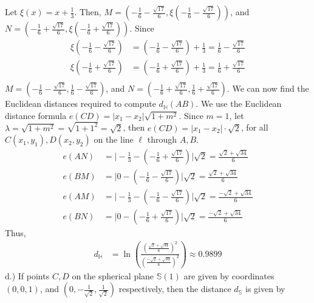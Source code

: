 \documentclass{report}
\begin{document}
    Let $\xi(x) = x+\frac{1}{3}$. Then, $M = \left(-\frac{1}{6} - \frac{\sqrt{17}}{6}, \xi\left(-\frac{1}{6} - \frac{\sqrt{17}}{6}\right)\right)$, and $N = \left(-\frac{1}{6} + \frac{\sqrt{17}}{6}, \xi\left(-\frac{1}{6} + \frac{\sqrt{17}}{6}\right)\right) $. Since
    \begin{align*}
        \xi\left(-\frac{1}{6} - \frac{\sqrt{17}}{6}\right) &= \left(-\frac{1}{6} - \frac{\sqrt{17}}{6}\right) + \frac{1}{3} = \frac{1}{6} - \frac{\sqrt{17}}{6} \\
        \xi\left(-\frac{1}{6} + \frac{\sqrt{17}}{6}\right) &= \left(-\frac{1}{6} + \frac{\sqrt{17}}{6}\right) + \frac{1}{3} = \frac{1}{6} + \frac{\sqrt{17}}{6} \\
    \end{align*}
    $M = \left(-\frac{1}{6} - \frac{\sqrt{17}}{6}, \frac{1}{6} - \frac{\sqrt{17}}{6}\right)$, and $N = \left(-\frac{1}{6} + \frac{\sqrt{17}}{6}, \frac{1}{6} + \frac{\sqrt{17}}{6}\right) $. We can now find the Euclidean distances required to compute $d_{\mathbb{H}}(AB)$. We use the Euclidean distance formula $e(CD) = \bigg\lvert x_{1} - x_{2} \bigg\rvert \sqrt{1 + m^{2}}$. Since $m = 1$, let $\lambda = \sqrt{1 + m^{2}} = \sqrt{1 + 1^{2}} = \sqrt{2} $, then $e(CD) = \bigg\lvert x_{1} - x_{2} \bigg\rvert \cdot \sqrt{2} $, for all $C(x_{1},y_{1}), D(x_{2}, y_{2})$ on the line $\ell$ through $A,B$.
    \begin{align*}
        e(AN) &= \bigg\lvert -\frac{1}{3}-\left(-\frac{1}{6}+\frac{\sqrt{17}}{6}\right) \bigg\rvert \sqrt{2} = \frac{\sqrt{2} + \sqrt{34}}{6}\\ 
        e(BM) &= \bigg\lvert 0-\left(-\frac{1}{6}-\frac{\sqrt{17}}{6}\right) \bigg\rvert \sqrt{2} = \frac{\sqrt{2} + \sqrt{34}}{6}\\
        e(AM) &= \bigg\lvert -\frac{1}{3} - \left(-\frac{1}{6}-\frac{\sqrt{17}}{6}\right) \bigg\rvert \sqrt{2} = \frac{-\sqrt{2} + \sqrt{34}}{6}\\
        e(BN) &= \bigg\lvert 0 - \left(-\frac{1}{6} + \frac{\sqrt{17}}{6}\right) \bigg\rvert \sqrt{2} = \frac{-\sqrt{2} + \sqrt{34}}{6}
    \end{align*}
    Thus,
    \begin{align*}
        d_{\mathbb{H}} &= \ln{\left(\frac{\left(\frac{\sqrt{2} + \sqrt{34}}{6}\right)^{2}}{\left(\frac{-\sqrt{2} + \sqrt{34}}{6}\right)^{2}}\right)} \approx 0.9899
    \end{align*}
    d.) If points $C,D$ on the spherical plane $\mathbb{S}(1)$ are given by coordinates $\left(0,0,1\right)$, and $\left(0,-\frac{1}{\sqrt{2}}, \frac{1}{\sqrt{2}}\right) $ respectively, then the distance $d_{\mathbb{S}}$ is given by
\end{document}
